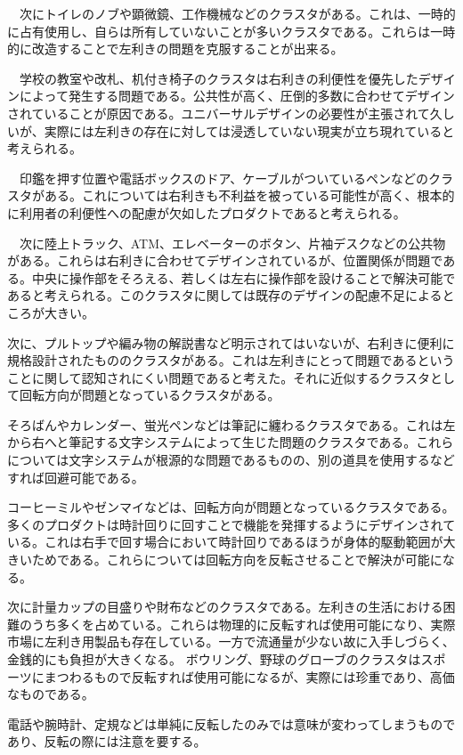 \documentclass{jsarticle}
\begin{document}
　次にトイレのノブや顕微鏡、工作機械などのクラスタがある。これは、一時的に占有使用し、自らは所有していないことが多いクラスタである。これらは一時的に改造することで左利きの問題を克服することが出来る。

　学校の教室や改札、机付き椅子のクラスタは右利きの利便性を優先したデザインによって発生する問題である。公共性が高く、圧倒的多数に合わせてデザインされていることが原因である。ユニバーサルデザインの必要性が主張されて久しいが、実際には左利きの存在に対しては浸透していない現実が立ち現れていると考えられる。

　印鑑を押す位置や電話ボックスのドア、ケーブルがついているペンなどのクラスタがある。これについては右利きも不利益を被っている可能性が高く、根本的に利用者の利便性への配慮が欠如したプロダクトであると考えられる。

　次に陸上トラック、ATM、エレベーターのボタン、片袖デスクなどの公共物がある。これらは右利きに合わせてデザインされているが、位置関係が問題である。中央に操作部をそろえる、若しくは左右に操作部を設けることで解決可能であると考えられる。このクラスタに関しては既存のデザインの配慮不足によるところが大きい。

次に、プルトップや編み物の解説書など明示されてはいないが、右利きに便利に規格設計されたもののクラスタがある。これは左利きにとって問題であるということに関して認知されにくい問題であると考えた。それに近似するクラスタとして回転方向が問題となっているクラスタがある。

そろばんやカレンダー、蛍光ペンなどは筆記に纏わるクラスタである。これは左から右へと筆記する文字システムによって生じた問題のクラスタである。これらについては文字システムが根源的な問題であるものの、別の道具を使用するなどすれば回避可能である。

コーヒーミルやゼンマイなどは、回転方向が問題となっているクラスタである。多くのプロダクトは時計回りに回すことで機能を発揮するようにデザインされている。これは右手で回す場合において時計回りであるほうが身体的駆動範囲が大きいためである。これらについては回転方向を反転させることで解決が可能になる。

次に計量カップの目盛りや財布などのクラスタである。左利きの生活における困難のうち多くを占めている。これらは物理的に反転すれば使用可能になり、実際市場に左利き用製品も存在している。一方で流通量が少ない故に入手しづらく、金銭的にも負担が大きくなる。
ボウリング、野球のグローブのクラスタはスポーツにまつわるもので反転すれば使用可能になるが、実際には珍重であり、高価なものである。

電話や腕時計、定規などは単純に反転したのみでは意味が変わってしまうものであり、反転の際には注意を要する。
\end{document}
